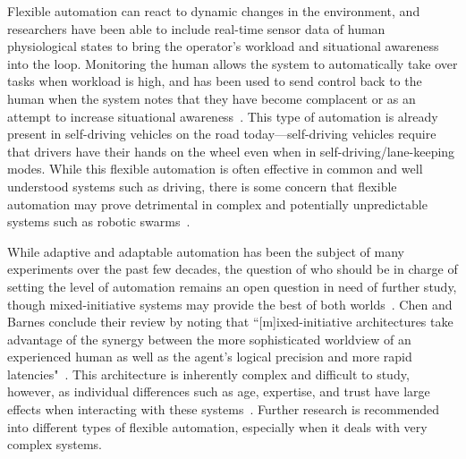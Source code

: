 Flexible automation can react to dynamic changes in the environment, and researchers have been able to include real-time sensor data of human physiological states to bring the operator's workload and situational awareness into the loop.
Monitoring the human allows the system to automatically take over tasks when workload is high, and has been used to send control back to the human when the system notes that they have become complacent or as an attempt to increase situational awareness~\citep{lu_human_2016}.
This type of automation is already present in self-driving vehicles on the road today—self-driving vehicles require that drivers have their hands on the wheel even when in self-driving/lane-keeping modes.
While this flexible automation is often effective in common and well understood systems such as driving, there is some concern that flexible automation may prove detrimental in complex and potentially unpredictable systems such as robotic swarms~\citep{kolling_human_2016}.

While adaptive and adaptable automation has been the subject of many experiments over the past few decades, the question of who should be in charge of setting the level of automation remains an open question in need of further study, though mixed-initiative systems may provide the best of both worlds~\citep{chen_humanagent_2014, parasuraman_humans:_2008}.
Chen and Barnes conclude their review by noting that ``[m]ixed-initiative architectures take advantage of the synergy between the more sophisticated worldview of an experienced human as well as the agent's logical precision and more rapid latencies"~\citep{chen_humanagent_2014}.
This architecture is inherently complex and difficult to study, however, as individual differences such as age, expertise, and trust have large effects when interacting with these systems~\citep{schaefer_meta-analysis_2016}.
Further research is recommended into different types of flexible automation, especially when it deals with very complex systems.

